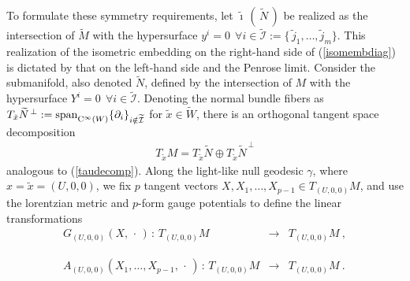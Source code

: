 \documentclass[11pt,a4paper]{article}
\def\nn{\nonumber}
\def\bea{\begin{eqnarray}}
\def\eea{\end{eqnarray}}
\newcommand{\beq}{\begin{eqnarray}}
\newcommand{\eeq}{\end{eqnarray}}
\begin{document}
To formulate these symmetry requirements, let
$\widetilde{\imath}\,(\,\widetilde{N}\,)$ be realized as the
intersection of $\widetilde{M}$ with the hypersurface $y^i=0~~\forall
i\in\widetilde{\mathcal I}:=\{\,\tilde j_1,\dots,\tilde j_m\}$. This
realization of the isometric embedding on the right-hand side of
(\ref{isomembdiag}) is dictated by that on the left-hand side and the
Penrose limit. Consider the submanifold, also denoted
$\widetilde{N}$, defined by the intersection of $M$ with the
hypersurface $Y^i=0~~\forall i\in\widetilde{\mathcal I}$. Denoting the
normal bundle fibers as $T_{\tilde x}\widetilde{N}^{\,\perp}:={\rm
  span}^{~}_{{\rm C}^\infty(W)}\{\partial_i\}_{i\notin\widetilde{\mathcal I}}$ for
$\tilde x\in\widetilde{W}$, there is an orthogonal tangent space
decomposition
\beq
T_{\tilde x}M=T_{\tilde x}\widetilde{N}\oplus T_{\tilde x}
\widetilde{N}^{\,\perp}
\label{tautildedecomp}\eeq
analogous to (\ref{taudecomp}). Along the light-like null geodesic
$\gamma$, where $x=\tilde x=(U,0,0)$, we fix $p$ tangent vectors
$X,X_1,\dots,X_{p-1}\in T_{(U,0,0)}M$, and use the lorentzian metric
and $p$-form gauge potentials to define the linear transformations
\bea
G_{(U,0,0)}(X,\,\cdot\,)\,:\,T_{(U,0,0)}M&\longrightarrow&
T_{(U,0,0)}M \ , \label{Gelinmap}\\&&{~~~~}^{~~}_{~~}\nn\\
A_{(U,0,0)}(X_1,\dots,X_{p-1},\,\cdot\,)\,:\,T_{(U,0,0)}M&
\longrightarrow&T_{(U,0,0)}M \ .
\label{Aelinmap}\eea
\end{document}
